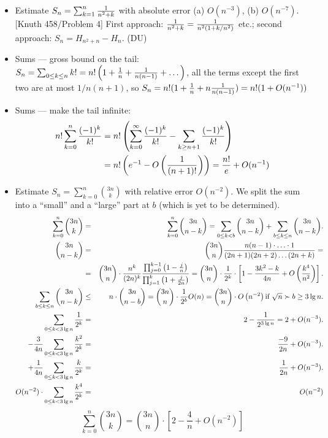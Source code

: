 \documentclass[10pt, a4paper]{article}
\begin{document}
\begin{itemize}
\item Estimate $S_n = \sum_{k=1}^n {1\over n^2+k}$ with absolute error (a) $O(n^{-3})$, (b) $O(n^{-7})$. [Knuth 458/Problem 4]
First approach: ${1\over n^2+k}={1\over n^2(1+k/n^2)}$ etc.; second approach: $S_n = H_{n^2+n}-H_n$. (DU)

\item Sums --- gross bound on the tail: $S_n = \sum_{0\le k\le n} k! = n!\left(1+{1\over n}+{1\over n(n-1)}+ \dots\right)$,
all the terms except the first two are at most $1/n(n+1)$, so $S_n = n!(1+{1\over n}+n{1\over n(n-1)}) = n!(1+O(n^{-1}))$

\item Sums --- make the tail infinite:
\begin{align*}
n!\sum_{k=0}^n{(-1)^k\over k!} &= n!\left(\sum_{k=0}^\infty{(-1)^k\over k!}-\sum_{k\ge n+1}{(-1)^k\over k!}\right)\\
                               &= n!\left(e^{-1}-O\left({1\over (n+1)!}\right)\right)= {n!\over e}+O(n^{-1})
\end{align*}

\item Estimate $S_n=\sum_{k=0}^n {3n\choose k}$ with relative error $O(n^{-2})$. We split the sum into a ``small'' and a ``large'' part at $b$ (which is yet to be determined).
\begin{eqnarray*}
\sum_{k=0}^{n} \binom {3n}k&=&\sum_{k=0}^{n} \binom {3n}{n-k}=\sum_{0\leq k<b} \binom {3n}{n-k}+\sum_{b\le k\le n} \binom {3n}{n-k}.\\
\binom{3n}{n-k} &=& \binom{3n}{n} {n(n-1)\cdot\ldots \cdot 1\over (2n+1)(2n+2)\ldots(2n+k)} =\\
                &=& \binom{3n}{n}\cdot\frac{n^k}{(2n)^k}\frac{\prod_{j=0}^{k-1}\left(1-\frac jn\right)}{\prod_{j=1}^k \left(1+\frac j{2n}\right)}=\binom{3n}{n}\cdot\frac{1}{2^k}\cdot\left[1-\frac{3k^2-k}{4n}+O\left(\frac{k^4}{n^2}\right)\right].\\
\sum_{b\le k\le n} \binom {3n}{n-k}&\le &n\cdot \binom{3n}{n-b}=\binom{3n}{n}\cdot \frac{1}{2^b} O(n)=\binom{3n}{n}\cdot O\left(n^{-2}\right) \hbox{if $\sqrt n\succ b\ge 3\lg n$}.\\
\sum_{0\leq k<3\lg n}\frac{1}{2^k}&=&2-\frac{1}{2^{3\lg n}}=2+O(n^{-3}).\\
-\frac{3}{4n}\sum_{0\leq k<3\lg n}\frac{k^2}{2^k}&=&\frac{-9}{2n}+O(n^{-3}).\\
+\frac{1}{4n}\sum_{0\leq k<3\lg n}\frac{k}{2^k}&=&\frac{1}{2n}+O(n^{-3}).\\
O(n^{-2})\cdot\sum_{0\leq k<3\lg n}\frac{k^4}{2^k}&=&O(n^{-2})\\
\end{eqnarray*}
$$\sum_{k=0}^{n} \binom {3n}k=\binom{3n}{n}\cdot\left[2-\frac{4}{n}+ O(n^{-2})\right]$$


\end{itemize}
\end{document}
